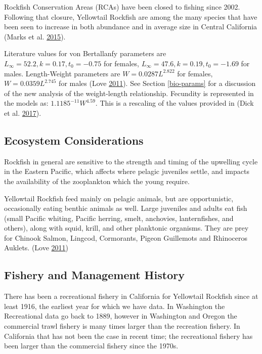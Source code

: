 \documentclass[12pt,]{article}
\begin{document}
Rockfish Conservation Areas (RCAs) have been closed to fishing since
2002. Following that closure, Yellowtail Rockfish are among the many
species that have been seen to increase in both abundance and in average
size in Central California (Marks et al.
\protect\hyperlink{ref-Marks2015}{2015}).

Literature values for von Bertallanfy parameters are
\(L_\infty = 52.2, k = 0.17, t_0 = -0.75\) for females,
\(L_\infty = 47.6, k=0.19, t_0 = -1.69\) for males. Length-Weight
parameters are \(W = 0.0287L^{2.822}\) for females,
\(W = 0.0359L^{2.745}\) for males (Love
\protect\hyperlink{ref-Love2011}{2011}). See Section \ref{bio-params}
for a discussion of the new analysis of the weight-length relationship.
Fecundity is represented in the models as: \(1.1185^{-11}W^{4.59}\).
This is a rescaling of the values provided in (Dick et al.
\protect\hyperlink{ref-Dick2017}{2017}).

\subsection*{Ecosystem Considerations}\label{ecosystem-considerations-1}

Rockfish in general are sensitive to the strength and timing of the
upwelling cycle in the Eastern Pacific, which affects where pelagic
juveniles settle, and impacts the availability of the zooplankton which
the young require.

Yellowtail Rockfish feed mainly on pelagic animals, but are
opportunistic, occasionally eating benthic animals as well. Large
juveniles and adults eat fish (small Pacific whiting, Pacific herring,
smelt, anchovies, lanternfishes, and others), along with squid, krill,
and other planktonic organisms. They are prey for Chinook Salmon,
Lingcod, Cormorants, Pigeon Guillemots and Rhinoceros Auklets. (Love
\protect\hyperlink{ref-Love2011}{2011})

\subsection{Fishery and Management
History}\label{fishery-and-management-history}

There has been a recreational fishery in California for Yellowtail
Rockfish since at least 1916, the earliest year for which we have data.
In Washington the Recreational data go back to 1889, however in
Washington and Oregon the commercial trawl fishery is many times larger
than the recreation fishery. In California that has not been the case in
recent time; the recreational fishery has been larger than the
commercial fishery since the 1970s.
\end{document}
